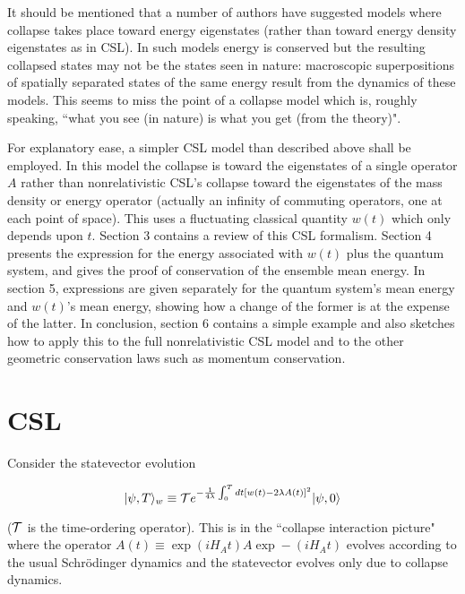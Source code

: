 \documentclass[12pt]{article}
\begin{document}
  It should be mentioned that a number of authors have suggested models 
where collapse takes place toward energy eigenstates (rather than toward energy 
density eigenstates as in CSL)\cite{SouthAfricans, Percival, Hughston}. In such models  
energy is conserved but the resulting collapsed states 
may not be the states seen in nature: macroscopic superpositions of 
spatially separated states of the same energy result from the dynamics of these models.  This 
seems to miss the point of a collapse model which is, roughly speaking, 
``what you see (in nature) is what you get (from the theory)".   

	For explanatory ease,  
a simpler CSL model than 
described above shall be employed.  In this model 
the collapse is toward the eigenstates 
of a single operator $A$ rather than nonrelativistic CSL's 
collapse toward the eigenstates of 
the mass density or energy operator (actually an infinity of commuting operators, 
one at each point of space). This uses a fluctuating classical quantity $w(t)$ which 
only depends upon $t$.  Section 3 contains a review of this CSL formalism.  
Section 4 presents the expression for the energy associated with $w(t)$ 
plus the quantum system, 
and gives the proof of conservation of the ensemble mean energy.  
In section 5, expressions are given separately for 
the quantum system's mean energy and $w(t)$'s mean 
energy, showing how a change of the former is at the expense of the latter. In conclusion, 
section 6 contains a simple example and 
also sketches how to apply this to the full 
nonrelativistic CSL model and to the other geometric conservation laws such as 
momentum conservation.
 

\section{CSL}\label{CSL}

\hspace{\parindent}Consider the statevector evolution  
	
\begin{equation}\label{3}
	|\psi,T\rangle_{w}\equiv{\cal T}e^{-\frac{1}{4\lambda}\int_{0}^{T}
 dt[w(t)-2\lambda A(t)]^{2}}|\psi,0\rangle
\end{equation}

\noindent(${\cal T}$ is the time-ordering operator).  This is in the 
``collapse interaction picture" where the operator  
$A(t)\equiv \exp(iH_{A}t)A\exp-(iH_{A}t)$ evolves according to the usual Schr\"odinger 
dynamics and the statevector evolves only due to collapse dynamics. 
\end{document}
